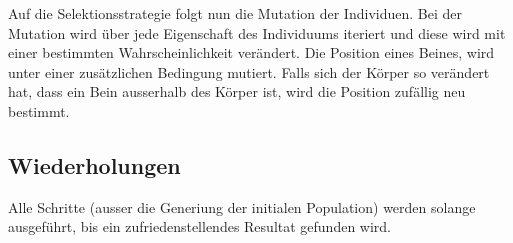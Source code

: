       Auf die Selektionsstrategie folgt nun die Mutation der Individuen.
      Bei der Mutation wird über jede Eigenschaft des Individuums iteriert und
      diese wird mit einer bestimmten Wahrscheinlichkeit verändert. Die Position eines Beines,
      wird unter einer zusätzlichen Bedingung mutiert. Falls sich der Körper so verändert hat,
      dass ein Bein ausserhalb des Körper ist, wird die Position zufällig neu bestimmt.

    \subsection{Wiederholungen}
      Alle Schritte (ausser die Generiung der initialen Population) werden solange ausgeführt,
      bis ein zufriedenstellendes Resultat gefunden wird.
